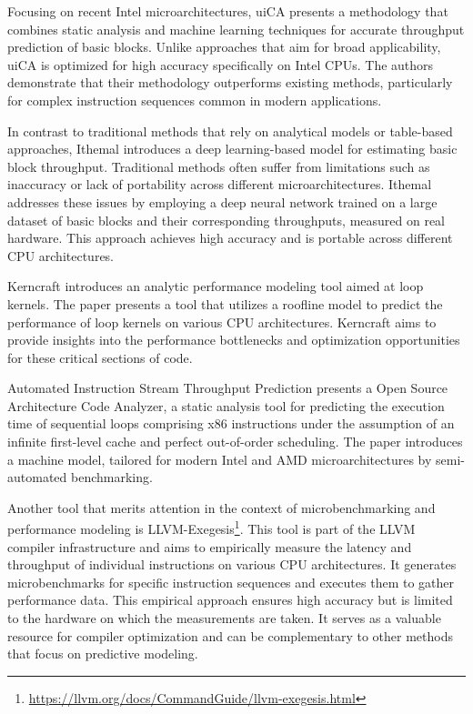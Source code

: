 Focusing on recent Intel microarchitectures, uiCA presents a methodology that combines static analysis
and machine learning techniques for accurate throughput prediction of basic 
blocks\cite{abelUiCAAccurateThroughput2022}. Unlike approaches that aim for broad applicability, 
uiCA is optimized for high accuracy specifically on Intel CPUs. The authors demonstrate that their 
methodology outperforms existing methods, particularly for complex instruction sequences common in 
modern applications.

In contrast to traditional methods that rely on analytical models or table-based approaches, Ithemal 
introduces a deep learning-based model for estimating basic block throughput. Traditional methods 
often suffer from limitations such as inaccuracy or lack of portability across different microarchitectures.
Ithemal addresses these issues by employing a deep neural network trained on a large dataset of basic
blocks and their corresponding throughputs, measured on real hardware. This approach achieves high 
accuracy and is portable across different CPU architectures.

Kerncraft introduces an analytic performance modeling tool aimed at loop 
kernels\cite{hammerKerncraftToolAnalytic2017}. The paper presents a tool that utilizes a roofline model 
to predict the performance of loop kernels on various CPU architectures. Kerncraft aims to provide insights
into the performance bottlenecks and optimization opportunities for these critical sections of code.

Automated Instruction Stream Throughput Prediction presents a Open Source Architecture Code Analyzer, 
a static analysis tool for predicting the execution time of sequential loops comprising x86 instructions
under the assumption of an infinite first-level cache and perfect out-of-order 
scheduling\cite{laukemannAutomatedInstructionStream2018}. The paper introduces a machine model, tailored 
for modern Intel and AMD microarchitectures by semi-automated benchmarking.

Another tool that merits attention in the context of microbenchmarking and performance modeling is 
LLVM-Exegesis\footnote{\url{https://llvm.org/docs/CommandGuide/llvm-exegesis.html}}.
This tool is part of the LLVM compiler infrastructure and aims to 
empirically measure the latency and throughput of individual instructions on various CPU architectures. 
It generates microbenchmarks for specific instruction sequences and executes them to gather performance 
data. This empirical approach ensures high accuracy but is limited to the hardware on which the measurements
are taken. It serves as a valuable resource for compiler optimization and can be complementary to other 
methods that focus on predictive modeling.

